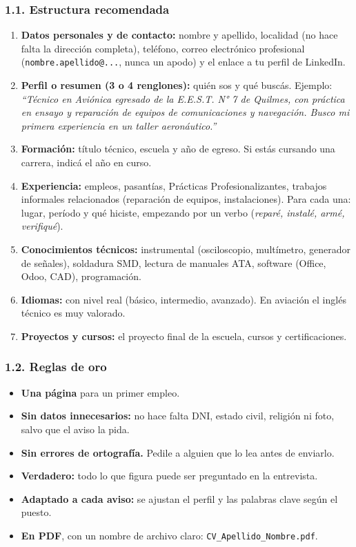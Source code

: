 \subsubsection*{1.1. Estructura recomendada}
\begin{enumerate}
  \item \textbf{Datos personales y de contacto:} nombre y apellido, localidad (no hace falta
        la dirección completa), teléfono, correo electrónico profesional
        (\texttt{nombre.apellido@...}, nunca un apodo) y el enlace a tu perfil de LinkedIn.
  \item \textbf{Perfil o resumen (3 o 4 renglones):} quién sos y qué buscás. Ejemplo:
        \textit{``Técnico en Aviónica egresado de la E.E.S.T. N° 7 de Quilmes, con práctica en
        ensayo y reparación de equipos de comunicaciones y navegación. Busco mi primera
        experiencia en un taller aeronáutico.''}
  \item \textbf{Formación:} título técnico, escuela y año de egreso. Si estás cursando una
        carrera, indicá el año en curso.
  \item \textbf{Experiencia:} empleos, pasantías, Prácticas Profesionalizantes, trabajos
        informales relacionados (reparación de equipos, instalaciones). Para cada una: lugar,
        período y qué hiciste, empezando por un verbo (\textit{reparé, instalé, armé, verifiqué}).
  \item \textbf{Conocimientos técnicos:} instrumental (osciloscopio, multímetro, generador de
        señales), soldadura SMD, lectura de manuales ATA, software (Office, Odoo, CAD),
        programación.
  \item \textbf{Idiomas:} con nivel real (básico, intermedio, avanzado). En aviación el inglés
        técnico es muy valorado.
  \item \textbf{Proyectos y cursos:} el proyecto final de la escuela, cursos y certificaciones.
\end{enumerate}

\subsubsection*{1.2. Reglas de oro}
\begin{itemize}
  \item \textbf{Una página} para un primer empleo.
  \item \textbf{Sin datos innecesarios:} no hace falta DNI, estado civil, religión ni foto,
        salvo que el aviso la pida.
  \item \textbf{Sin errores de ortografía.} Pedile a alguien que lo lea antes de enviarlo.
  \item \textbf{Verdadero:} todo lo que figura puede ser preguntado en la entrevista.
  \item \textbf{Adaptado a cada aviso:} se ajustan el perfil y las palabras clave según el
        puesto.
  \item \textbf{En PDF}, con un nombre de archivo claro: \texttt{CV\_Apellido\_Nombre.pdf}.
\end{itemize}

